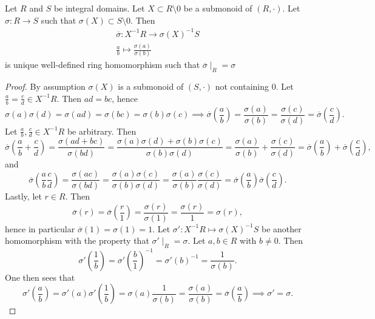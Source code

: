 \begin{lemma}\label{ExtendingRingHomomorphismToLocalization}
    Let $R$ and $S$ be integral domains. Let $X\subset R\setminus 0$ be a submonoid of $(R,\cdot)$. Let $\sigma: R\rightarrow S$ such that $\sigma(X)\subset S\setminus 0$. Then 
    \begin{gather*}
        \overline{\sigma}: X^{-1}R \rightarrow \sigma(X)^{-1}S\\
        \frac{a}{b}\mapsto \frac{\sigma(a)}{\sigma(b)}
    \end{gather*}
    is unique well-defined ring homomorphism such that $\overline{\sigma}\mid_R = \sigma$
\end{lemma}
\begin{proof}
    By assumption $\sigma(X)$ is a submonoid of $(S,\cdot)$ not containing $0$. Let $\frac{a}{b}=\frac{c}{d}\in X^{-1}R$. Then $ad = bc$, hence $$\sigma(a)\sigma(d) = \sigma(ad)=\sigma(bc)=\sigma(b)\sigma(c)\implies \overline{\sigma}\left(\frac{a}{b}\right)=\frac{\sigma(a)}{\sigma(b)}=\frac{\sigma(c)}{\sigma(d)} = \overline{\sigma}\left(\frac{c}{d}\right).$$
    Let $\frac{a}{b},\frac{c}{d}\in X^{-1}R$ be arbitrary. Then 
    $$\overline{\sigma}\left(\frac{a}{b}+\frac{c}{d}\right) = \frac{\sigma(ad+bc)}{\sigma(bd)}=\frac{\sigma(a)\sigma(d)+\sigma(b)\sigma(c)}{\sigma(b)\sigma(d)}= \frac{\sigma(a)}{\sigma(b)}+\frac{\sigma(c)}{\sigma(d)}=\overline{\sigma}\left(\frac{a}{b}\right)+\overline{\sigma}\left(\frac{c}{d}\right),$$
    and 
    $$\overline{\sigma}\left(\frac{a}{b}\frac{c}{d}\right) = \frac{\sigma(ac)}{\sigma(bd)} = \frac{\sigma(a)\sigma(c)}{\sigma(b)\sigma(d)}= \frac{\sigma(a)}{\sigma(b)}\frac{\sigma(c)}{\sigma(d)}=\overline{\sigma}\left(\frac{a}{b}\right)\overline{\sigma}\left(\frac{c}{d}\right).$$
    Lastly, let $r\in R$. Then 
    $$\overline{\sigma}(r)=\overline{\sigma}\left(\frac{r}{1}\right) = \frac{\sigma(r)}{\sigma(1)}=\frac{\sigma(r)}{1}=\sigma(r),$$
    hence in particular $\overline{\sigma}(1)=\sigma(1)=1$.
    Let $\sigma': X^{-1}R\mapsto \sigma(X)^{-1}S$ be another homomorphism with the property that $\sigma'\mid_R = \sigma.$ Let $a,b\in R$ with $b\neq0$. Then 
    $$\sigma'\left(\frac{1}{b}\right) =\sigma'\left(\frac{b}{1}\right)^{-1} = \sigma'(b)^{-1}= \frac{1}{\sigma(b)}.$$
    One then sees that 
    $$\sigma'\left(\frac{a}{b}\right) = \sigma'(a)\sigma'\left(\frac{1}{b}\right)= \sigma(a)\frac{1}{\sigma(b)}=\frac{\sigma(a)}{\sigma(b)}=\overline{\sigma}\left(\frac{a}{b}\right)\implies \sigma'=\sigma.$$
    
\end{proof}
